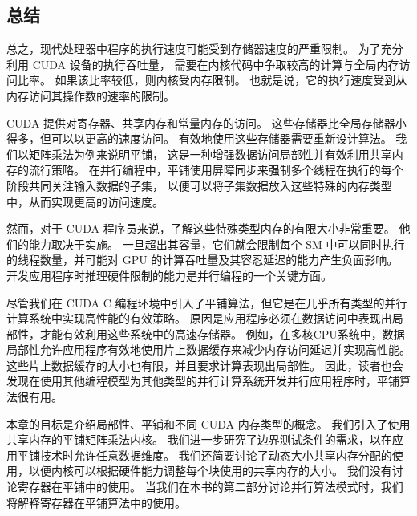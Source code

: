 \subsection{总结}
总之，现代处理器中程序的执行速度可能受到存储器速度的严重限制。 为了充分利用 CUDA 设备的执行吞吐量，
需要在内核代码中争取较高的计算与全局内存访问比率。 如果该比率较低，则内核受内存限制。 
也就是说，它的执行速度受到从内存访问其操作数的速率的限制。

CUDA 提供对寄存器、共享内存和常量内存的访问。 这些存储器比全局存储器小得多，但可以以更高的速度访问。 
有效地使用这些存储器需要重新设计算法。 我们以矩阵乘法为例来说明平铺，
这是一种增强数据访问局部性并有效利用共享内存的流行策略。 
在并行编程中，平铺使用屏障同步来强制多个线程在执行的每个阶段共同关注输入数据的子集，
以便可以将子集数据放入这些特殊的内存类型中，从而实现更高的访问速度。

然而，对于 CUDA 程序员来说，了解这些特殊类型内存的有限大小非常重要。 他们的能力取决于实施。 
一旦超出其容量，它们就会限制每个 SM 中可以同时执行的线程数量，并可能对 GPU 的计算吞吐量及其容忍延迟的能力产生负面影响。 
开发应用程序时推理硬件限制的能力是并行编程的一个关键方面。

尽管我们在 CUDA C 编程环境中引入了平铺算法，但它是在几乎所有类型的并行计算系统中实现高性能的有效策略。 
原因是应用程序必须在数据访问中表现出局部性，才能有效利用这些系统中的高速存储器。 
例如，在多核CPU系统中，数据局部性允许应用程序有效地使用片上数据缓存来减少内存访问延迟并实现高性能。 
这些片上数据缓存的大小也有限，并且要求计算表现出局部性。 
因此，读者也会发现在使用其他编程模型为其他类型的并行计算系统开发并行应用程序时，平铺算法很有用。

本章的目标是介绍局部性、平铺和不同 CUDA 内存类型的概念。 我们引入了使用共享内存的平铺矩阵乘法内核。 
我们进一步研究了边界测试条件的需求，以在应用平铺技术时允许任意数据维度。 
我们还简要讨论了动态大小共享内存分配的使用，以便内核可以根据硬件能力调整每个块使用的共享内存的大小。 
我们没有讨论寄存器在平铺中的使用。 当我们在本书的第二部分讨论并行算法模式时，我们将解释寄存器在平铺算法中的使用。
